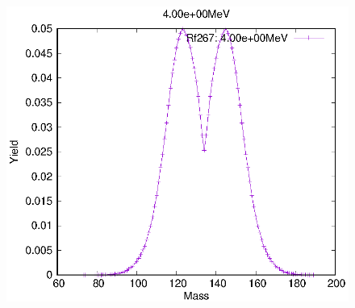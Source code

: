 \begin{figure}[htbp]
\begin{minipage}{0.33\textwidth} \begin{center} \includegraphics[width=\textwidth]{YA/Rf267_4.00e+00.eps} \end{center} \end{minipage}
\end{figure}
